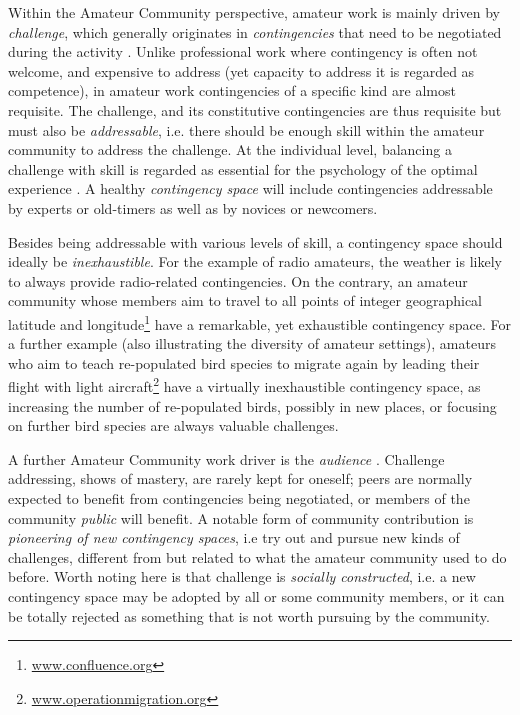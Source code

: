 \documentclass{sig-alt-release2}
\begin{document}
Within the Amateur Community perspective, amateur work is mainly driven by \textit{challenge}, which generally originates in \textit{contingencies} that need to be negotiated during the activity \cite{bogdan_bowers07}. Unlike professional work where contingency is often not welcome, and expensive to address (yet capacity to address it is regarded as competence), in amateur work contingencies of a specific kind are almost requisite. The challenge, and its constitutive contingencies are thus requisite but must also be \textit{addressable}, i.e. there should be enough skill within  the amateur community to address the challenge. At the individual level, balancing a challenge with skill is regarded as essential for the psychology of the optimal experience \cite{csik90}. A healthy \textit{contingency space} will include contingencies addressable by experts or old-timers as well as by novices or newcomers.

Besides being addressable with various levels of skill, a contingency space should ideally be \textit{inexhaustible}. For the example of radio amateurs, the weather is likely to always provide radio-related contingencies. On the contrary, an amateur community whose members aim to travel to all points of integer geographical latitude and longitude\footnote{\url{www.confluence.org}} have a remarkable, yet exhaustible contingency space. For a further example (also illustrating the diversity of amateur settings), amateurs who aim to teach re-populated bird species to migrate again by leading their flight with light aircraft\footnote{\url{www.operationmigration.org}} have a virtually inexhaustible contingency space, as increasing the number of re-populated birds, possibly in new places, or focusing on further bird species are always valuable challenges.

A further Amateur Community work driver is the \textit{audience} \cite{bogdan03}. Challenge addressing, shows of mastery, are rarely kept for oneself; peers are normally expected to benefit from contingencies being negotiated, or members of the community \textit{public} will benefit. A notable form of community contribution is \textit{pioneering of new contingency spaces}, i.e try out and pursue new kinds of challenges, different from but related to what the amateur community used to do before. Worth noting here is that challenge is \textit{socially constructed}, i.e. a new contingency space may be adopted by all or some community members, or it can be totally rejected as something that is not worth pursuing by the community.
\end{document}
